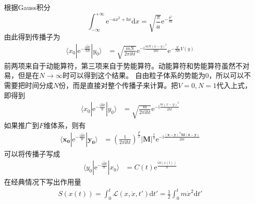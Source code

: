         根据Gauss积分
        \begin{equation}
            \int_{-\infty}^{+\infty} \mathrm{e}^{-ax^2+bx} \mathrm{d}x = \sqrt{\frac {\pi}a} \mathrm{e}^{-\frac {b^2}{4a}}
        \end{equation}
        由此得到传播子为
        \begin{equation}\begin{aligned}
            \langle x_0 | \mathrm{e}^{-\frac {\mathrm{i}\hat{H}t}{N\hbar}} | y_0 \rangle &= \sqrt{\frac {mN}{2\pi\mathrm{i} \hbar t}} \mathrm{e}^{-\mathrm{i}\frac {mN(x-y)^2}{2\hbar t}}\mathrm{e}^{-\frac {\mathrm{i}t}{N\hbar} V(y)}
        \end{aligned}\end{equation}
        前两项来自于动能算符，第三项来自于势能算符。动能算符和势能算符虽然不对易，但是在$N \to \infty$时可以得到这个结果。
        自由粒子体系的势能为0，所以可以不需要把时间分成$N$份，而是直接对整个传播子来计算。把$V=0,N=1$代入上式，即得到
        \begin{equation}\begin{aligned}
            \langle x_0 | \mathrm{e}^{-\frac {\mathrm{i}\hat{H}t}{\hbar}} |y_0 \rangle &= \sqrt{\frac {m}{2\pi\mathrm{i} \hbar t}} \mathrm{e}^{-\mathrm{i}\frac {m(x-y)^2}{2\hbar t}}
        \end{aligned}\end{equation}
        如果推广到$F$维体系，则有
        \begin{equation}\begin{aligned}
            \langle \bm{x_0} | \mathrm{e}^{-\frac {\mathrm{i}\hat{H}t}{\hbar}} |\bm{y_0} \rangle &= (\frac {1}{2\pi\mathrm{i} \hbar t})^{\frac F2} |\bm{M}|^{\frac 12} \mathrm{e}^{-\mathrm{i}\frac {\bm{(x-y)}^{\mathrm{T}} \bm{M (x-y)}}{2\hbar t}}
        \end{aligned}\end{equation}
        可以将传播子写成
        \begin{equation}\begin{aligned}
            \langle y_0 | \mathrm{e}^{-\frac {\mathrm{i}\hat{H}t}{\hbar}} |x_0 \rangle &= C(t) \mathrm{e}^{\frac {\mathrm{i}S(x(t))}{\hbar}}
        \end{aligned}\end{equation}
        在经典情况下写出作用量
        \begin{equation}\begin{aligned}
            S(x(t)) = \int_0^t \mathcal{L}(x,\dot{x},t') \mathrm{d}t' = \frac 12 \int_0^t m\dot{x}^2 \mathrm{d}t'
        \end{aligned}\end{equation}
